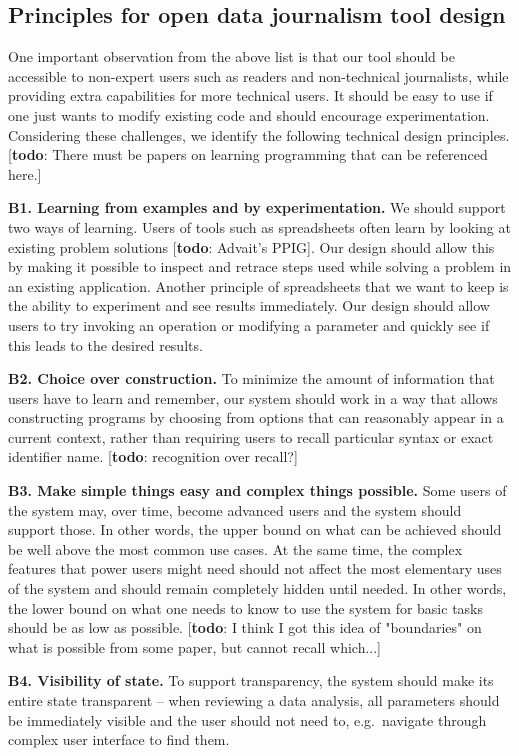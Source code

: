 \documentclass{sigchi}
\newcommand{\todo}[1]{\textcolor{todoColor}{[\textbf{todo}: #1]}}
\begin{document}
\subsection{Principles for open data journalism tool design}
One important observation from the above list is that our tool should be accessible to non-expert
users such as readers and non-technical journalists, while providing extra capabilities for more
technical users. It should be easy to use if one just wants to modify existing code and should
encourage experimentation. Considering these challenges, we identify the following technical
design principles. \todo{There must be papers on learning programming that can be referenced
here.}

\textbf{B1. Learning from examples and by experimentation.} We should support two ways of learning.
Users of tools such as spreadsheets
often learn by looking at existing problem solutions \todo{Advait's PPIG}. Our design should allow
this by making it possible to inspect and retrace steps used while solving a problem in an existing
application. Another principle of spreadsheets that we want to keep is the ability to experiment
and see results immediately. Our design should allow users to try invoking an operation or modifying
a parameter and quickly see if this leads to the desired results.

\textbf{B2. Choice over construction.} To minimize the amount of information that users have to
learn and remember, our system should work in a way that allows constructing programs by
choosing from options that can reasonably appear in a current context, rather than requiring
users to recall particular syntax or exact identifier name.
\todo{recognition over recall?}

\textbf{B3. Make simple things easy and complex things possible.} Some users of the system may, over time, become advanced users
and the system should support those. In other words, the upper bound on what can be achieved
should be well above the most common use cases. At the same time, the complex features that power users might
need should not affect the most elementary uses of the system and should remain completely hidden
until needed. In other words, the lower bound on what one needs to know to use the system for basic
tasks should be as low as possible. \todo{I think I got this idea of "boundaries" on what
is possible from some paper, but cannot recall which...}

\textbf{B4. Visibility of state.} To support transparency, the system should make its entire state
transparent -- when reviewing a data analysis, all parameters should be immediately visible and the
user should not need to, e.g.~navigate through complex user interface to find them.
\end{document}
